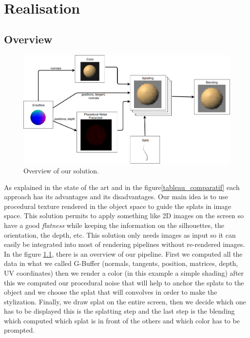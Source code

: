 \chapter{Realisation}


\section{Overview}

\begin{figure}[H]
    \begin{center}
    \includegraphics[scale=0.4]{images/Overview2.png}
    \end{center}
    \caption{Overview of our solution.}
    \label{overview}
\end{figure}

As explained in the state of the art and in the figure\ref{tableau_comparatif} each approach has its advantages and its disadvantages. Our main idea is to use procedural texture rendered in the object space to guide the splats in image space.  This solution permits to apply something like 2D images on the screen so have a good \textit{flatness} while keeping the information on the silhouettes, the orientation, the depth, etc. This solution only needs images as input so it can easily be integrated into most of rendering pipelines without re-rendered images. In the figure \ref{overview}, there is an overview of our pipeline. First we computed all the data  in what we called G-Buffer (normals, tangents, position, matrices, depth, UV coordinates) then we render a color (in this example a simple shading) after this we computed our procedural noise that will help to anchor the splats to the object and we choose the splat that will convolves in order to make the stylization. Finally, we draw splat on the entire screen, then we decide which one has to be displayed this is the splatting step and the last step is the blending which computed which splat is in front of the others and which color has to be prompted. \newline

